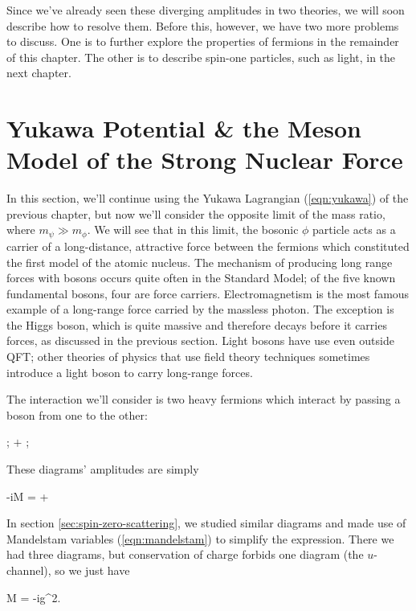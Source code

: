 Since we've already seen these diverging amplitudes in two theories, we will soon describe how to resolve them. Before this, however, we have two more problems to discuss. One is to further explore the properties of fermions in the remainder of this chapter. The other is to describe spin-one particles, such as light, in the next chapter.


\section{Yukawa Potential \& the Meson Model of the Strong Nuclear Force}
In this section, we'll continue using the Yukawa Lagrangian (\ref{eqn:yukawa}) of the previous chapter, but now we'll consider the opposite limit of the mass ratio, where $m_\psi \gg m_\phi$. We will see that in this limit, the bosonic $\phi$ particle acts as a carrier of a long-distance, attractive force between the fermions which constituted the first model of the atomic nucleus. The mechanism of producing long range forces with bosons occurs quite often in the Standard Model; of the five known fundamental bosons, four are force carriers. Electromagnetism is the most famous example of a long-range force carried by the massless photon. The exception is the Higgs boson, which is quite massive and therefore decays before it carries forces, as discussed in the previous section. Light bosons have use even outside QFT; other theories of physics that use field theory techniques sometimes introduce a light boson to carry long-range forces.

The interaction we'll consider is two heavy fermions which interact by passing a boson from one to the other:
\begin{center}
  ;
  \hspace{1em}$+$
  \hspace{1em}
  ;
\end{center}
These diagrams' amplitudes are simply
\begin{e}
  -iM =  + 
\end{e}
In section \ref{sec:spin-zero-scattering}, we studied similar diagrams and made use of Mandelstam variables (\ref{eqn:mandelstam}) to simplify the expression. There we had three diagrams, but conservation of charge forbids one diagram (the $u$-channel), so we just have
\begin{e}
  M = -ig^2.
  \label{eqn:relativistic-amplitude-yukawa}
\end{e}

